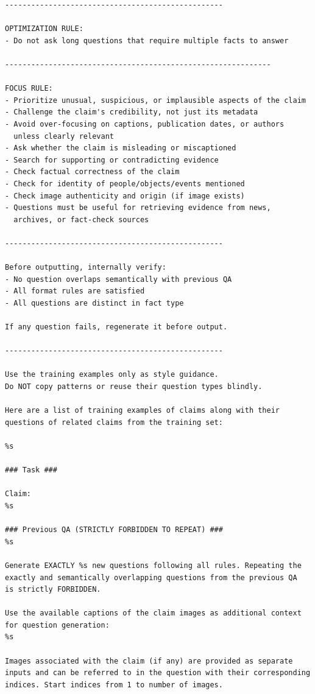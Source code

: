 \begin{verbatim}
--------------------------------------------------

OPTIMIZATION RULE:
- Do not ask long questions that require multiple facts to answer

-------------------------------------------------------------

FOCUS RULE:
- Prioritize unusual, suspicious, or implausible aspects of the claim
- Challenge the claim's credibility, not just its metadata
- Avoid over-focusing on captions, publication dates, or authors
  unless clearly relevant
- Ask whether the claim is misleading or miscaptioned
- Search for supporting or contradicting evidence
- Check factual correctness of the claim
- Check for identity of people/objects/events mentioned
- Check image authenticity and origin (if image exists)
- Questions must be useful for retrieving evidence from news,
  archives, or fact-check sources

--------------------------------------------------

Before outputting, internally verify:
- No question overlaps semantically with previous QA
- All format rules are satisfied
- All questions are distinct in fact type

If any question fails, regenerate it before output.

--------------------------------------------------

Use the training examples only as style guidance.
Do NOT copy patterns or reuse their question types blindly.

Here are a list of training examples of claims along with their
questions of related claims from the training set:

%s

### Task ###

Claim:
%s

### Previous QA (STRICTLY FORBIDDEN TO REPEAT) ###
%s

Generate EXACTLY %s new questions following all rules. Repeating the
exactly and semantically overlapping questions from the previous QA
is strictly FORBIDDEN.

Use the available captions of the claim images as additional context
for question generation:
%s

Images associated with the claim (if any) are provided as separate
inputs and can be referred to in the question with their corresponding
indices. Start indices from 1 to number of images.
\end{verbatim}

